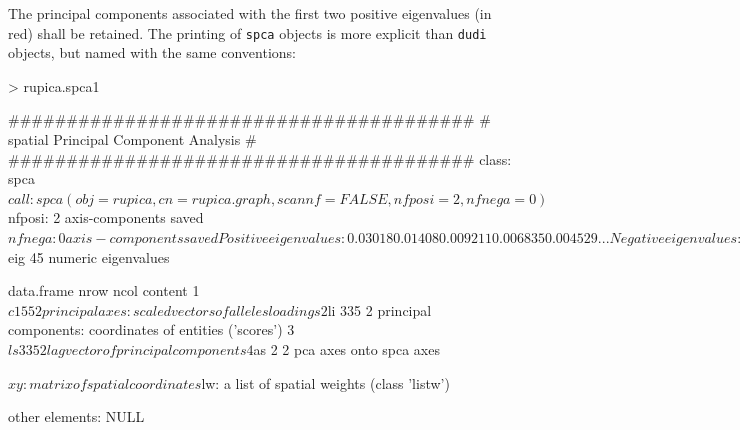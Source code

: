 \documentclass{article}
\begin{document}
\noindent The principal components associated with the first two
positive eigenvalues (in red) shall be retained.
The printing of \texttt{spca} objects is more explicit than
\texttt{dudi} objects, but named with the same conventions:
\begin{Schunk}
\begin{Sinput}
> rupica.spca1
\end{Sinput}
\begin{Soutput}
	########################################
	# spatial Principal Component Analysis #
	########################################
class: spca
$call: spca(obj = rupica, cn = rupica.graph, scannf = FALSE, nfposi = 2, 
    nfnega = 0)

$nfposi: 2 axis-components saved
$nfnega: 0 axis-components saved
Positive eigenvalues: 0.03018 0.01408 0.009211 0.006835 0.004529 ...
Negative eigenvalues: -0.008611 -0.006414 -0.004451 -0.003963 -0.003329 ...

  vector length mode    content    
1 $eig   45     numeric eigenvalues

  data.frame nrow ncol content                                                 
1 $c1        55   2    principal axes: scaled vectors of alleles loadings      
2 $li        335  2    principal components: coordinates of entities ('scores')
3 $ls        335  2    lag vector of principal components                      
4 $as        2    2    pca axes onto spca axes                                 

$xy: matrix of spatial coordinates
$lw: a list of spatial weights (class 'listw')

other elements: NULL
\end{Soutput}
\end{Schunk}
\end{document}
